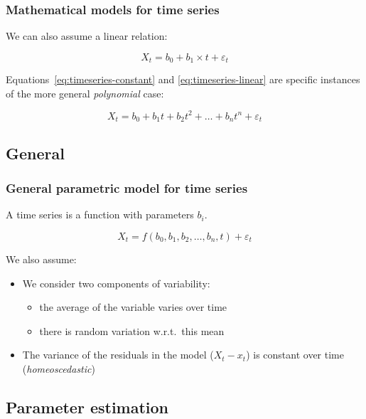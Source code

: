 \documentclass{beamer}
\begin{document}
\begin{frame}
  \frametitle{Mathematical models for time series}

  We can also assume a linear relation:
  
  \begin{equation}
    X_{t} = b_{0} + b_{1} \times t + \varepsilon_{t}
    \label{eq:timeseries-linear}
  \end{equation}

  Equations~\ref{eq:timeseries-constant} and \ref{eq:timeseries-linear} are specific instances of the more general \emph{polynomial} case:

  \begin{equation}
    X_{t} = b_{0} + b_{1} t + b_{2} t^{2} + \dots + b_{n} t^{n} + \varepsilon_{t}
    \label{eq:timeseries-polynomial}
  \end{equation}
\end{frame}

\subsection{General}

\begin{frame}
  \frametitle{General parametric model for time series}

  A time series is a function with parameters $b_i$.

  \begin{equation}
    X_{t} = f(b_{0}, b_{1}, b_{2}, \dots , b_{n}, t) + \varepsilon_{t}
    \label{eq:timeseries-parametric}
  \end{equation}

  We also assume:

  \begin{itemize}
    \item We consider two components of variability:
      \begin{itemize}
        \item the average of the variable varies over time
        \item there is random variation w.r.t.~this mean
      \end{itemize}
    \item The variance of the residuals in the model ($X_t - x_t$) is constant over time (\emph{homeoscedastic})
  \end{itemize}
\end{frame}

\subsection{Parameter estimation}
\end{document}
